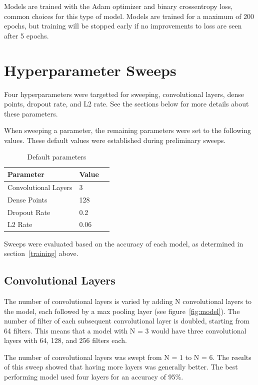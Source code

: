 \documentclass{article}
\begin{document}
Models are trained with the Adam optimizer and binary crossentropy loss, common choices for this type of model. Models are trained for a maximum of 200 epochs, but training will be stopped early if no improvements to loss are seen after 5 epochs.


\section{Hyperparameter Sweeps}

Four hyperparameters were targetted for sweeping, convolutional layers, dense points, dropout rate, and L2 rate. See the sections below for more details about these parameters.

When sweeping a parameter, the remaining parameters were set to the following values. These default values were established during preliminary sweeps.

\begin{table}[H]
    \caption{Default parameters}
    \label{parameters}
    \centering
    \begin{tabular}{lll}
      \toprule
      Parameter     & Value  \\
      \midrule
      Convolutional Layers & 3     \\
      Dense Points     & 128     \\
      Dropout Rate     & 0.2  \\
      L2 Rate     & 0.06  \\
      \bottomrule
    \end{tabular}
  \end{table}

Sweeps were evaluated based on the accuracy of each model, as determined in section~\ref{training} above. 


\subsection{Convolutional Layers}

The number of convolutional layers is varied by adding N convolutional layers to the model, each followed by a max pooling layer (see figure~\ref{fig:model}). The number of filter of each subsequent convolutional layer is doubled, starting from 64 filters. This means that a model with N = 3 would have three convolutional layers with 64, 128, and 256 filters each.

The number of convolutional layers was swept from N = 1 to N = 6. The results of this sweep showed that having more layers was generally better. The best performing model used four layers for an accuracy of 95\%. 
\end{document}
